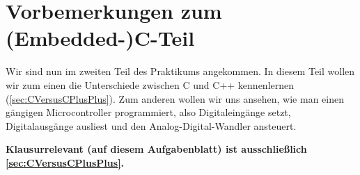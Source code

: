 \section*{\ExercisePrefixEmbeddedC Vorbemerkungen zum (Embedded-)C-Teil}

Wir sind nun im zweiten Teil des Praktikums angekommen.
In diesem Teil wollen wir zum einen die Unterschiede zwischen C und C++ kennenlernen (\ref{sec:CVersusCPlusPlus}).
Zum anderen wollen wir uns ansehen, wie man einen gängigen Microcontroller programmiert, also Digitaleingänge setzt, Digitalausgänge ausliest und den Analog-Digital-Wandler ansteuert.

\textbf{Klausurrelevant (auf diesem Aufgabenblatt) ist ausschließlich \ref{sec:CVersusCPlusPlus}.}
